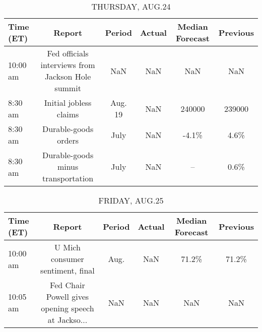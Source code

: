 \documentclass{article}%
\begin{document}
%


\begin{table}[htbp]%
\caption{THURSDAY, AUG.24}%
\centering%
\begin{adjustbox}{width=1\textwidth}%
\begin{tabular}{lccccc}
\toprule
Time (ET) &                                            Report &  Period & Actual & Median Forecast & Previous \\
\midrule
 10:00 am & Fed officials interviews from Jackson Hole summit &     NaN &    NaN &             NaN &      NaN \\
  8:30 am &                            Initial jobless claims & Aug. 19 &    NaN &          240000 &   239000 \\
  8:30 am &                              Durable-goods orders &    July &    NaN &           -4.1\% &     4.6\% \\
  8:30 am &                Durable-goods minus transportation &    July &    NaN &              -- &     0.6\% \\
\bottomrule
\end{tabular}
%
\end{adjustbox}%
\end{table}

%


\begin{table}[htbp]%
\caption{FRIDAY, AUG.25}%
\centering%
\begin{adjustbox}{width=1\textwidth}%
\begin{tabular}{lccccc}
\toprule
Time (ET) &                                             Report & Period & Actual & Median Forecast & Previous \\
\midrule
 10:00 am &                   U Mich consumer sentiment, final &   Aug. &    NaN &           71.2\% &    71.2\% \\
 10:05 am & Fed Chair Powell gives opening speech at Jackso... &    NaN &    NaN &             NaN &      NaN \\
\bottomrule
\end{tabular}
%
\end{adjustbox}%
\end{table}
\end{document}
